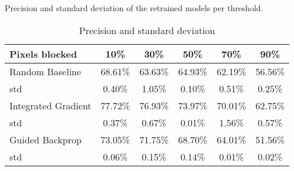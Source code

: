 \documentclass[
		a4paper,
		oneside,
		onecolumn,
		openany,
		parskip=half*,
		table,
		11pt,
		fleqn,
	]{scrbook}
\begin{document}
Precision and standard deviation of the retrained models per threshold.


\begin{table}[h]
	\centering
	\begin{tabular}{|l|c|c|c|c|c|}
		\hline
		Pixels blocked & 10\% & 30\% & 50\% & 70\% & 90\% \\
		\hline
		Random Baseline & 68.61\% & 63.63\% & 64.93\% & 62.19\% & 56.56\% \\
		std & 0.40\% & 1.05\% & 0.10\% & 0.51\% & 0.25\% \\
		\hline
		Integrated Gradient & 77.72\% & 76.93\% & 73.97\% & 70.01\% & 62.75\% \\
		std & 0.37\% & 0.67\% & 0.01\% & 1.56\% & 0.57\% \\
		\hline
		Guided Backprop & 73.05\% & 71.75\% & 68.70\% & 64.01\% & 51.56\% \\
		std & 0.06\% & 0.15\% & 0.14\% & 0.01\% & 0.02\% \\
		\hline
	
	\end{tabular} \newline
	
	\caption{Precision and standard deviation}
	\label{tab:sclass_precision_ig}
\end{table}
\end{document}
